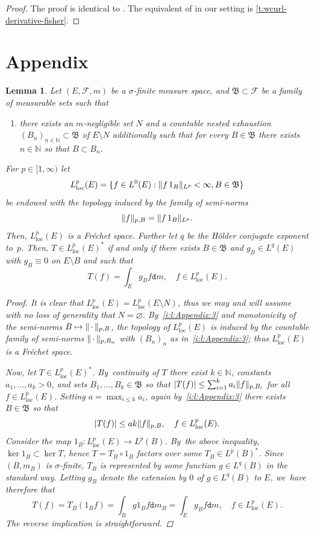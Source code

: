 \documentclass[JEP,XML,SOM,Unicode,published]{cedram}
\newcommand\mto{\mathchoice{\longmapsto}{\mapsto}{\mapsto}{\mapsto}}
\newtheorem{lemma}[theorem]{Lemma}
\theoremstyle{definition}
\theoremstyle{remark}
\DeclarePairedDelimiter{\set}{\lbrace}{\rbrace}
\DeclarePairedDelimiter{\abs}{\lvert}{\rvert}
\DeclarePairedDelimiter{\norm}{\lVert}{\rVert}
\newcommand{\emparg}{\,\cdot\,}
\begin{document}
\begin{proof}
The proof is identical to \cite[Th.\,7.3]{ErbarMaas}.
The equivalent of \cite[Prop.\,4.1]{ErbarMaas} in our setting is \cref{t:wcurl-derivative-fisher}.
\end{proof}

\section{Appendix}
\begin{lemma}\label{t:DualLLoc}
Let $(E,\mathscr{F},m)$ be a $\sigma$-finite measure space, and $\mathfrak{B}\subset \mathscr{F}$ be a family of measurable sets such that
\begin{enumerate}[$(\rm a)$, wide]
\item\label{i:l:Appendix:3} there exists an $m$-negligible set $N$ and a countable nested exhaustion \hbox{$(B_n)_{n\in\mathbb{N}}\subset \mathfrak{B}$} of $E\setminus N$ additionally such that for every $B\in\mathfrak{B}$ there exists $n\in\mathbb{N}$ so that $B\subset B_n$.
\end{enumerate}
For $p\in [1,\infty)$ let
\[
L^p_{\mathrm{loc}}(E)= \set{f\in L^0(E): \norm{f\, 1_B}_{L^p}<\infty , B\in\mathfrak{B}}
\]
be endowed with the topology induced by the family of semi-norms
\[
\norm{f}_{p,B}= \norm{f \, 1_B}_{L^p}.
\]
Then, $L^p_{\mathrm{loc}}(E)$ is a Fréchet space.
Further let $q$ be the Hölder conjugate exponent to~$p$. Then, $T\in L^p_{\mathrm{loc}}(E)^*$ if and only if there exists $B\in\mathfrak{B}$ and $g_B\in L^q(E)$ with $g_B\equiv 0$ on $E\setminus B$ and such that
\[
T(f)=\int_E g_B f \mathtt{d} m, \quad f\in L^p_{\mathrm{loc}}(E).
\]
\begin{proof}
It is clear that $L^p_{\mathrm{loc}}(E)=L^p_{\mathrm{loc}}(E\setminus N)$, thus we may and will assume with no loss of generality that $N=\varnothing$.
By~\cref{i:l:Appendix:3} and monotonicity of the semi-norms $B\mto \norm{\emparg}_{p,B}$, the topology of $L^p_{\mathrm{loc}}(E)$ is induced by the countable family of semi-norms $\norm{\emparg}_{p,B_n}$ with $(B_n)_n$ as in~\cref{i:l:Appendix:3}; thus $L^p_{\mathrm{loc}}(E)$ is a Fréchet space.

Now, let $T\!\in\! L^p_{\mathrm{loc}}(E)^*$. By~continuity of $T$ there exist $k\!\in\!\mathbb{N}$, constants $a_1,\dotsc,a_k\!>\!0$, and sets $B_1,\dotsc, B_k\in\mathfrak{B}$ so that $\abs{T(f)}\leq \sum_{i=1}^k a_i \norm{f}_{p,B_i}$ for all $f\in L^p_{\mathrm{loc}}(E)$.
Setting $a= \max_{i\leq k} a_i$, again by~\cref{i:l:Appendix:3} there exists $B\in\mathfrak{B}$ so that
\[
\abs{T(f)}\leq a k \norm{f}_{p,B} , \quad f \in L^p_{\mathrm{loc}}(E).
\]
Consider the map $1_B\colon L^p_{\mathrm{loc}}(E)\to L^p(B)$.
By~the above inequality, $\ker 1_B\subset \ker T$, hence $T=T_B\circ 1_B$ factors over some $T_B\in L^p(B)^*$.
Since $(B,m_B)$ is $\sigma$-finite, $T_B$ is represented by some function $g\in L^q(B)$ in the standard way.
Letting $g_B$ denote the extension by $0$ of $g\in L^q(B)$ to $E$, we~have therefore that
\[
T(f)=T_B (1_B f)=\int_B g 1_B f \mathtt{d} m_B= \int_E g_B f \mathtt{d} m, \quad f\in L^p_{\mathrm{loc}}(E).
\]
The reverse implication is straightforward.
\end{proof}
\end{lemma}
\end{document}
